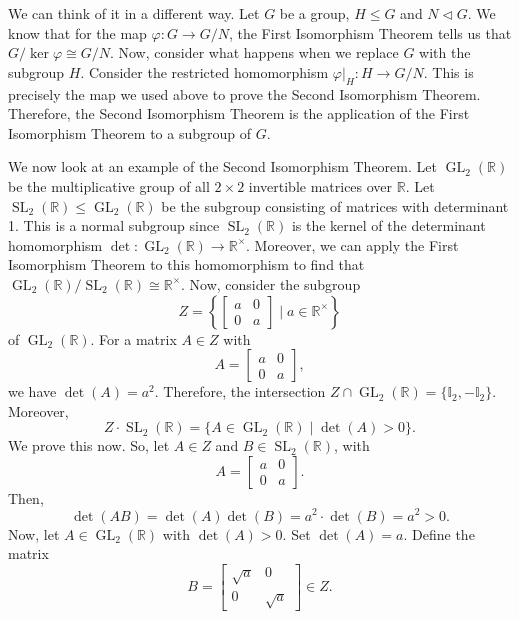 \documentclass[a4paper, openany]{memoir}
\theoremstyle{definition}
\theoremstyle{plain}
\begin{document}
\noindent We can think of it in a different way. Let $G$ be a group, $H \leqslant G$ and $N \vartriangleleft G$. We know that for the map $\varphi: G \to G/N$, the First Isomorphism Theorem tells us that $G/\ker \varphi \cong G/N$. Now, consider what happens when we replace $G$ with the subgroup $H$. Consider the restricted homomorphism $\varphi|_H: H \to G/N$. This is precisely the map we used above to prove the Second Isomorphism Theorem. Therefore, the Second Isomorphism Theorem is the application of the First Isomorphism Theorem to a subgroup of $G$.

We now look at an example of the Second Isomorphism Theorem. Let $\operatorname{GL}_2(\mathbb{R})$ be the multiplicative group of all $2 \times 2$ invertible matrices over $\mathbb{R}$. Let $\operatorname{SL}_2(\mathbb{R}) \leqslant \operatorname{GL}_2(\mathbb{R})$ be the subgroup consisting of matrices with determinant 1. This is a normal subgroup since $\operatorname{SL}_2(\mathbb{R})$ is the kernel of the determinant homomorphism $\det: \operatorname{GL}_2(\mathbb{R}) \to \mathbb{R}^{\times}$. Moreover, we can apply the First Isomorphism Theorem to this homomorphism to find that $\operatorname{GL}_2(\mathbb{R})/\operatorname{SL}_2(\mathbb{R}) \cong \mathbb{R}^{\times}$. Now, consider the subgroup
\[Z = \left\{\begin{bmatrix}
a & 0 \\
0 & a
\end{bmatrix} \mid a \in \mathbb{R}^{\times}\right\}\]
of $\operatorname{GL}_2(\mathbb{R})$. For a matrix $A \in Z$ with
\[A = \begin{bmatrix}
a & 0 \\
0 & a
\end{bmatrix},\]
we have $\det (A) = a^2$. Therefore, the intersection $Z \cap \operatorname{GL}_2(\mathbb{R}) = \{\mathbb{I}_2, - \mathbb{I}_2\}$. Moreover,
\[Z \cdot \operatorname{SL}_2(\mathbb{R}) = \{A \in \operatorname{GL}_2(\mathbb{R}) \mid \det (A) > 0\}.\]
We prove this now. So, let $A \in Z$ and $B \in \operatorname{SL}_2(\mathbb{R})$, with
\[A = \begin{bmatrix}
a & 0 \\
0 & a
\end{bmatrix}.\]
Then,
\[\det(AB) = \det(A) \det(B) = a^2 \cdot \det(B) = a^2 > 0.\]
Now, let $A \in \operatorname{GL}_2(\mathbb{R})$ with $\det(A) > 0$. Set $\det(A) = a$. Define the matrix
\[B = \begin{bmatrix}
\sqrt{a} & 0 \\
0 & \sqrt{a}
\end{bmatrix} \in Z.\]
\end{document}
